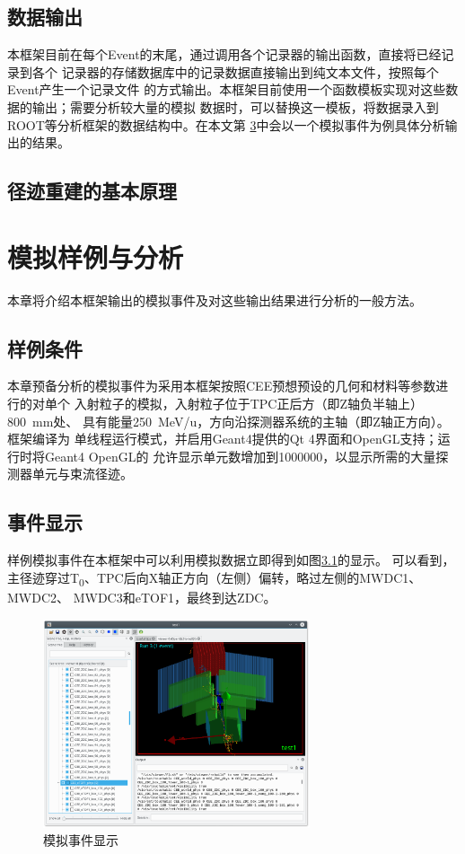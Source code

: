 \documentclass[bachelor,openany,oneside,color]{buaathesis}
\def\TZ{T\textsubscript{0}}
\begin{document}
\section{数据输出}

本框架目前在每个Event的末尾，通过调用各个记录器的输出函数，直接将已经记录到各个
记录器的存储数据库中的记录数据直接输出到纯文本文件，按照每个Event产生一个记录文件
的方式输出。本框架目前使用一个函数模板实现对这些数据的输出；需要分析较大量的模拟
数据时，可以替换这一模板，将数据录入到ROOT等分析框架的数据结构中。在本文第
\ref{chap:例子}中会以一个模拟事件为例具体分析输出的结果。

\section{径迹重建的基本原理}%


\chapter{模拟样例与分析}\label{chap:例子}

本章将介绍本框架输出的模拟事件及对这些输出结果进行分析的一般方法。

\section{样例条件}

本章预备分析的模拟事件为采用本框架按照CEE预想预设的几何和材料等参数进行的对单个
入射粒子的模拟，入射粒子位于TPC正后方（即Z轴负半轴上）\SI{800}{\milli\meter}处、
具有能量\SI{250}{\mega\eV/u}，方向沿探测器系统的主轴（即Z轴正方向）。框架编译为
单线程运行模式，并启用Geant4提供的Qt 4界面和OpenGL支持；运行时将Geant4 OpenGL的
允许显示单元数增加到1000000，以显示所需的大量探测器单元与束流径迹。

\section{事件显示}

样例模拟事件在本框架中可以利用模拟数据立即得到如图\ref{fig:EventDisplay}的显示。
可以看到，主径迹穿过\TZ、TPC后向X轴正方向（左侧）偏转，略过左侧的MWDC1、MWDC2、
MWDC3和eTOF1，最终到达ZDC。

\begin{figure}
	\centering
	\includegraphics[width=0.7\textwidth]{./resource/EventDisplay.png}
	\caption{模拟事件显示}\label{fig:EventDisplay}
\end{figure}
\end{document}
